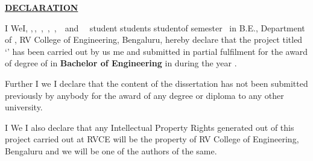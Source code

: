 
\thispagestyle{empty}
\vspace{-0.75cm}
\begin{center}
\Large\textbf{\underline{DECLARATION}} \par
\end{center}


\noindent \ifPG I \else \ifStuNameBUsed We\else I\fi\fi, \textbf{\printStuNameA}\ifPG ,$\,$\else\ifStuNameBUsed\ifStuNameCUsed,$\,$ \fi \textbf{\printStuNameB}\ifStuNameCUsed \ifStuNameDUsed,$\,$ \fi \textbf{\printStuNameC}\ifStuNameDUsed\ifStuNameEUsed\ifIDP,$\,$ \fi\fi \textbf{\printStuNameD}\ifIDP\ifStuNameEUsed\ifStuNameFUsed,$\,$ \fi \textbf{\printStuNameE}$\,$ \ifStuNameDUsed and $\,$ \textbf{\printStuNameF}$\,$ \fi \fi \fi \fi \fi \fi \fi \ifPG student\; \else \ifStuNameBUsed\; students\;\else\; student\;\fi\fi of \ifPG {}  \fi \else {} \else {} \else {}\fi \fi\fi\fi semester \ifPG \printMastersInSF\, in \printMastersPrgName \else B.E.\fi, Department of \printDepartmentLF, RV College of Engineering, Bengaluru, hereby declare that the \fi project titled `\textbf{\printTitle}' has been carried out by \ifStuNameBUsed us \else me \fi and submitted in partial fulfilment for the award of degree of \ifPG \textbf{\printMastersInLF} in \textbf{\printMastersPrgName} \else\textbf{Bachelor of Engineering} in \textbf{\printDepartmentLF} \fi during the year \printAcadYear.\\ \par

\noindent Further \ifPG I \else\ifStuNameBUsed we \else I \fi \fi declare that the content of the dissertation has not been submitted previously by anybody for the award of any degree or diploma to any other university.\\ \par

\noindent \ifPG I \else\ifStuNameBUsed We \else I \fi \fi also declare that any Intellectual Property Rights generated out of this project carried out at RVCE will be the property of RV College of Engineering, Bengaluru and we will be one of the authors of the same.


